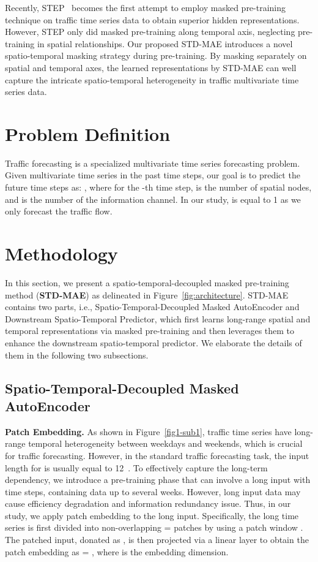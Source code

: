 \documentclass[letterpaper]{article} \usepackage{aaai24}  \usepackage{times}  \usepackage{helvet}  \usepackage{courier}  \usepackage[hyphens]{url}  \usepackage{graphicx} \urlstyle{rm} \def\UrlFont{\rm}  \usepackage{natbib}  \usepackage{caption} \frenchspacing  \setlength{\pdfpagewidth}{8.5in} \setlength{\pdfpageheight}{11in} \usepackage{algorithm}
\begin{document}
Recently, STEP~\cite{shao2022pre} becomes the first attempt to employ masked pre-training technique on traffic time series data to obtain superior hidden representations. However, STEP only did masked pre-training along temporal axis, neglecting pre-training in spatial relationships. Our proposed STD-MAE introduces a novel spatio-temporal masking strategy during pre-training. By masking separately on spatial and temporal axes, the learned representations by STD-MAE can well capture the intricate spatio-temporal heterogeneity in traffic multivariate time series data.


\section{Problem Definition}
Traffic forecasting is a specialized multivariate time series forecasting problem. Given multivariate time series  in the past  time steps, our goal is to predict the future  time steps as:    , where    for the -th time step,  is the number of spatial nodes, and  is the number of the information channel. In our study,  is equal to 1 as we only forecast the traffic flow.

\section{Methodology}
In this section, we present a spatio-temporal-decoupled masked pre-training method (\textbf{STD-MAE}) as delineated in Figure~\ref{fig:architecture}. 
STD-MAE contains two parts, i.e., Spatio-Temporal-Decoupled Masked AutoEncoder and Downstream Spatio-Temporal Predictor, which first learns long-range spatial and temporal representations via masked pre-training and then leverages them to enhance the downstream spatio-temporal predictor. We elaborate the details of them in the following two subsections. 
\subsection{Spatio-Temporal-Decoupled Masked AutoEncoder}
\noindent\textbf{Patch Embedding.} As shown in Figure~\ref{fig1-sub1}, traffic time series have long-range temporal heterogeneity between weekdays and weekends, which is crucial for traffic forecasting. However, in the standard traffic forecasting task, the input length  for  is usually equal to 12~\cite{li2018diffusion,yu2018spatio,wu2019graph,song2020spatial}. To effectively capture the long-term dependency, we introduce a pre-training phase that can involve a long input  with  time steps, containing data up to several weeks. However, long input data may cause efficiency degradation and information redundancy issue. Thus, in our study, we apply patch embedding to the long input. Specifically, the long time series is first divided into non-overlapping  =  patches by using a patch window . The patched input, donated as , is then projected via a linear layer to obtain the patch embedding  as  = , where  is the embedding dimension.
\end{document}
